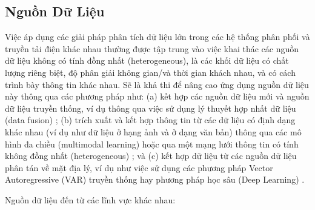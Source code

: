 \documentclass[utf8]{frontiersSCNS} %
\begin{document}
\subsection{Nguồn Dữ Liệu}
Việc áp dụng các giải pháp phân tích dữ liệu lớn trong các hệ thống phân phối và truyền tải điện khác nhau thường được tập trung vào việc khai thác các nguồn dữ liệu không có tính đồng nhất (heterogeneous), là các khối dữ liệu có chất lượng riêng biệt, độ phân giải không gian/và thời gian khách nhau, và có cách trình bày thông tin khác nhau. Sẽ là khả thi để nâng cao ứng dụng nguồn dữ liệu này thông qua các phương pháp như: (a) kết hợp các nguồn dữ liệu mới và nguồn dữ liệu truyền thống, ví dụ thông qua việc sử dụng lý thuyết hợp nhất dữ liệu (data fusion) \citep{SimoesCosta2013}; (b) trích xuất và kết hợp thông tin từ các dữ liệu có định dạng khác nhau (ví dụ như dữ liệu ở hạng ảnh và ở dạng văn bản) thông qua các mô hình đa chiều (multimodal learning) \citep{Srivastava2012} hoặc qua một mạng lưới thông tin có tính không đồng nhất (heterogeneous) \citep{Sun2016}; và (c) kết hợp dữ liệu từ các nguồn dữ liệu phân tán về mặt địa lý, ví dụ như việc sử dụng các phương pháp Vector Autoregressive (VAR) truyền thống \citep{Cavalcante2017} hay phương pháp học sâu (Deep Learning) \citep{Zhu2020}.

Nguồn dữ liệu đến từ các lĩnh vực khác nhau:
\end{document}
